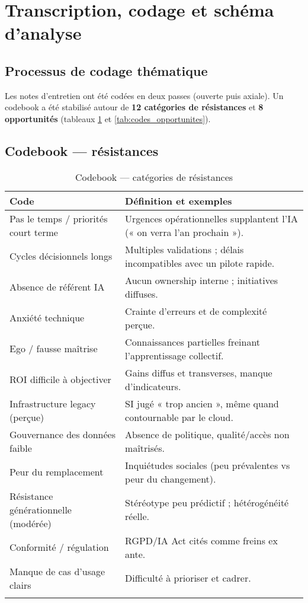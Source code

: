 \section{Transcription, codage et schéma d'analyse}
\subsection{Processus de codage thématique}
Les notes d'entretien ont été codées en deux passes (ouverte puis axiale). Un codebook a été stabilisé autour de \textbf{12 catégories de résistances} et \textbf{8 opportunités} (tableaux \ref{tab:codes_resistances} et \ref{tab:codes_opportunites}).

\subsection{Codebook — résistances}
\begin{longtable}{@{}p{4.5cm}p{9cm}@{}}
\toprule
\textbf{Code} & \textbf{Définition et exemples} \\
\midrule
Pas le temps / priorités court terme & Urgences opérationnelles supplantent l'IA (« on verra l'an prochain »). \\
Cycles décisionnels longs & Multiples validations ; délais incompatibles avec un pilote rapide. \\
Absence de référent IA & Aucun ownership interne ; initiatives diffuses. \\
Anxiété technique & Crainte d'erreurs et de complexité perçue. \\
Ego / fausse maîtrise & Connaissances partielles freinant l'apprentissage collectif. \\
ROI difficile à objectiver & Gains diffus et transverses, manque d'indicateurs. \\
Infrastructure legacy (perçue) & SI jugé « trop ancien », même quand contournable par le cloud. \\
Gouvernance des données faible & Absence de politique, qualité/accès non maîtrisés. \\
Peur du remplacement & Inquiétudes sociales (peu prévalentes vs peur du changement). \\
Résistance générationnelle (modérée) & Stéréotype peu prédictif ; hétérogénéité réelle. \\
Conformité / régulation & RGPD/IA Act cités comme freins ex ante. \\
Manque de cas d'usage clairs & Difficulté à prioriser et cadrer. \\
\bottomrule
\caption{Codebook — catégories de résistances}\label{tab:codes_resistances}
\end{longtable}

